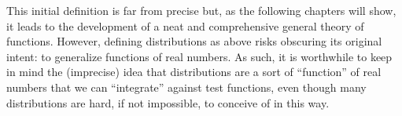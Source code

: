   This initial definition is far from precise but, as the following chapters will show, it leads to the development of a neat and comprehensive general theory of functions.
  However, defining distributions as above risks obscuring its original intent: to generalize functions of real numbers.
  As such, it is worthwhile to keep in mind the (imprecise) idea that distributions are a sort of ``function'' of real numbers that we can ``integrate'' against test functions, even though many distributions are hard, if not impossible, to conceive of in this way.
